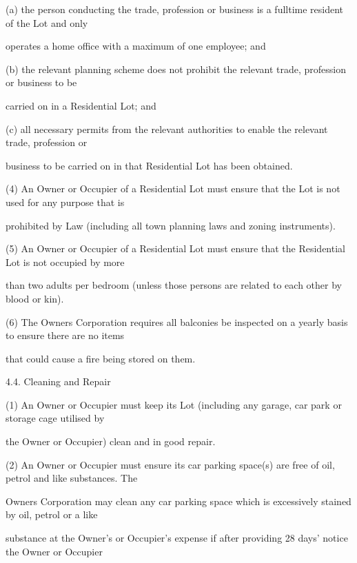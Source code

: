 \documentclass{article}
\begin{document}
{\fontsize{9.962}{1}(a) the person conducting the trade, profession or business is a fulltime resident of the Lot and only }

\newpage

{\fontsize{10.02}{1}operates a home office with a maximum of one employee; and }

{\fontsize{9.962}{1}(b) the relevant planning scheme does not prohibit the relevant trade, profession or business to be }

{\fontsize{10.02}{1}carried on in a Residential Lot; and }

{\fontsize{9.962}{1}(c) all necessary permits from the relevant authorities to enable the relevant trade, profession or }

{\fontsize{10.02}{1}business to be carried on in that Residential Lot has been obtained. }

{\fontsize{9.962}{1}(4) An Owner or Occupier of a Residential Lot must ensure that the Lot is not used for any purpose that is }

{\fontsize{10.02}{1}prohibited by Law (including all town planning laws and zoning instruments). }

{\fontsize{9.962}{1}(5) An Owner or Occupier of a Residential Lot must ensure that the Residential Lot is not occupied by more }

{\fontsize{10.02}{1}than two adults per bedroom (unless those persons are related to each other by blood or kin). }

{\fontsize{9.962}{1}(6) The Owners Corporation requires all balconies be inspected on a yearly basis to ensure there are no items }

{\fontsize{10.02}{1}that could cause a fire being stored on them. }

{\fontsize{9.99}{1}4.4. Cleaning and Repair }

{\fontsize{9.962}{1}(1) An Owner or Occupier must keep its Lot (including any garage, car park or storage cage utilised by }

{\fontsize{10.02}{1}the Owner or Occupier) clean and in good repair. }

{\fontsize{9.962}{1}(2) An Owner or Occupier must ensure its car parking space(s) are free of oil, petrol and like substances. The }

{\fontsize{10.02}{1}Owners Corporation may clean any car parking space which is excessively stained by oil, petrol or a like }

{\fontsize{10.02}{1}substance at the Owner's or Occupier's expense if after providing 28 days’ notice the Owner or Occupier }
\end{document}
